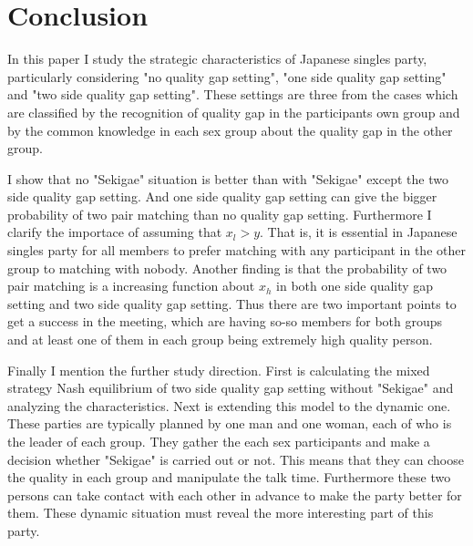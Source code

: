 \documentclass{article}
\begin{document}
\section{Conclusion}
\par
In this paper I study the strategic characteristics of Japanese singles party, particularly considering "no quality gap setting", "one side quality gap setting" and "two side quality gap setting". These settings are three from the cases which are classified by the recognition of quality gap in the participants own group and by the common knowledge in each sex group about the quality gap in the other group. 
\par
I show that no "Sekigae" situation is better than with "Sekigae" except the two side quality gap setting. And one side quality gap setting can give the bigger probability of two pair matching than no quality gap setting. Furthermore I clarify the importace of assuming that $x_l > y$. That is, it is essential in Japanese singles party for all members to prefer matching with any participant in the other group to matching with nobody.
Another finding is that the probability of two pair matching is a increasing function about $x_h$ in both one side quality gap setting and two side quality gap setting.
Thus there are two important points to get a success in the meeting, which are having so-so members for both groups and at least one of them in each group being extremely high quality person.
\par
Finally I mention the further study direction. First is calculating the mixed strategy Nash equilibrium of two side quality gap setting without "Sekigae" and analyzing the characteristics. Next is extending this model to the dynamic one. These parties are typically planned by one man and one woman, each of who is the leader of each group. They gather the each sex participants and make a decision whether "Sekigae" is carried out or not. This means that they can choose the quality in each group and manipulate the talk time. Furthermore these two persons can take contact with each other in advance to make the party better for them. These dynamic situation must reveal the more interesting part of this party.
\end{document}
